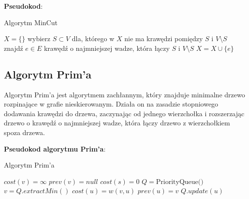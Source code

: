 \documentclass[11pt,a4paper]{article}
\begin{document}
\textbf{Pseudokod}:
\begin{algorithm}
    \caption{Algorytm MinCut}
    \begin{algorithmic}[1]
        \State $X = \{\}$ 
         
            \State wybierz $S\subset V$ dla, którego w $X$ nie ma krawędzi pomiędzy $S$ i $V\setminus S$
            \State znajdź $e \in E$ krawędź o najmniejszej wadze, która łączy $S$ i $V\setminus S$
            \State $X = X \cup \{e\}$ 
        \EndWhile
        \EndProcedure
    \end{algorithmic}
\end{algorithm}

\subsection{Algorytm Prim'a}
Algorytm Prim'a jest algorytmem zachłannym, który znajduje minimalne drzewo rozpinające w grafie nieskierowanym. Działa on na zasadzie stopniowego dodawania krawędzi do drzewa, zaczynając od jednego wierzchołka i rozszerzając drzewo o krawędź o najmniejszej wadze, która łączy drzewo z wierzchołkiem spoza drzewa.

\textbf{Pseudokod algorytmu Prim'a}:
\begin{algorithm}
    \caption{Algorytm Prim'a}
    \begin{algorithmic}[1]
         
            \State $cost(v)=\infty$ 
            \State $prev(v)=null$ 
        \EndFor
        \State $cost(s)=0$ 
        \State $Q = \text{PriorityQueue()}$ 
            \State $v= Q.extractMin()$ 
             
                 
                    \State $cost(u) = w(v,u)$ 
                    \State $prev(u) = v$ 
                    \State $Q.update(u)$ 
                \EndIf
            \EndFor
        \EndWhile
        \EndProcedure
    \end{algorithmic}
\end{algorithm}
\end{document}
